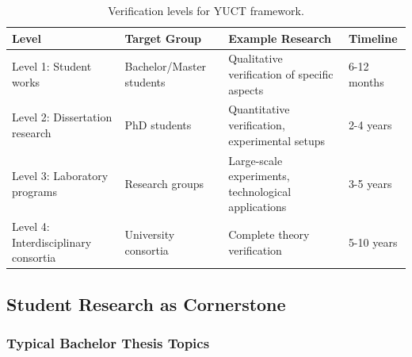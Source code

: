 \documentclass[12pt,a4paper]{article}
\begin{document}
	\begin{table}[h]
		\centering
		\begin{tabular}{p{}p{}p{}p{}}
			\toprule
			\textbf{Level} & \textbf{Target Group} & \textbf{Example Research} & \textbf{Timeline} \\
			\midrule
			Level 1: Student works & Bachelor/Master students & Qualitative verification of specific aspects & 6-12 months \\
			Level 2: Dissertation research & PhD students & Quantitative verification, experimental setups & 2-4 years \\
			Level 3: Laboratory programs & Research groups & Large-scale experiments, technological applications & 3-5 years \\
			Level 4: Interdisciplinary consortia & University consortia & Complete theory verification & 5-10 years \\
			\bottomrule
		\end{tabular}
		\caption{Verification levels for YUCT framework.}
		\label{tab:verification-levels}
	\end{table}
	
	\subsection{Student Research as Cornerstone}
	
	\subsubsection{Typical Bachelor Thesis Topics}
	
\end{document}
